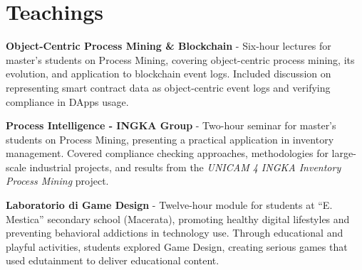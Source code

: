 \section{Teachings}

    \begin{onecolentry}
        \textbf{Object-Centric Process Mining \& Blockchain} - Six-hour lectures for master's students on Process Mining, covering object-centric process mining, its evolution, and application to blockchain event logs. Included discussion on representing smart contract data as object-centric event logs and verifying compliance in DApps usage.
    \end{onecolentry}

    \abitspace
    
    \begin{onecolentry}
        \textbf{Process Intelligence - INGKA Group \@Unicam} - Two-hour seminar for master's students on Process Mining, presenting a practical application in inventory management. Covered compliance checking approaches, methodologies for large-scale industrial projects, and results from the \textit{UNICAM 4 INGKA Inventory Process Mining} project.
    \end{onecolentry}

    \abitspace
    
    \begin{onecolentry}
        \textbf{Laboratorio di Game Design} - Twelve-hour module for students at ``E. Mestica'' secondary school (Macerata), promoting healthy digital lifestyles and preventing behavioral addictions in technology use. Through educational and playful activities, students explored Game Design, creating serious games that used edutainment to deliver educational content.
    \end{onecolentry}
    
